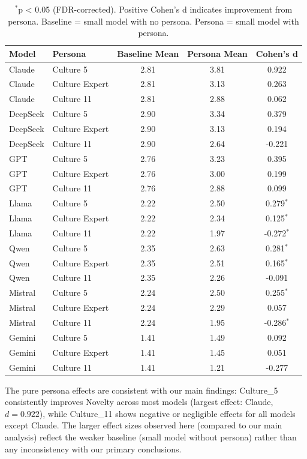 \documentclass{article}
\begin{document}
\begin{table}[H]
\centering
\caption{Pure Persona Effects (Small Baseline vs. Small+Persona) for Novelty}
\label{tab:pure_persona}
\begin{tabular}{llccc}
\toprule
Model & Persona & Baseline Mean & Persona Mean & Cohen's d \\
\midrule
Claude & Culture 5 & 2.81 & 3.81 & 0.922 \\
Claude & Culture Expert & 2.81 & 3.13 & 0.263 \\
Claude & Culture 11 & 2.81 & 2.88 & 0.062 \\
DeepSeek & Culture 5 & 2.90 & 3.34 & 0.379 \\
DeepSeek & Culture Expert & 2.90 & 3.13 & 0.194 \\
DeepSeek & Culture 11 & 2.90 & 2.64 & -0.221 \\
GPT & Culture 5 & 2.76 & 3.23 & 0.395 \\
GPT & Culture Expert & 2.76 & 3.00 & 0.199 \\
GPT & Culture 11 & 2.76 & 2.88 & 0.099 \\
Llama & Culture 5 & 2.22 & 2.50 & 0.279$^*$ \\
Llama & Culture Expert & 2.22 & 2.34 & 0.125$^*$ \\
Llama & Culture 11 & 2.22 & 1.97 & -0.272$^*$ \\
Qwen & Culture 5 & 2.35 & 2.63 & 0.281$^*$ \\
Qwen & Culture Expert & 2.35 & 2.51 & 0.165$^*$ \\
Qwen & Culture 11 & 2.35 & 2.26 & -0.091 \\
Mistral & Culture 5 & 2.24 & 2.50 & 0.255$^*$ \\
Mistral & Culture Expert & 2.24 & 2.29 & 0.057 \\
Mistral & Culture 11 & 2.24 & 1.95 & -0.286$^*$ \\
Gemini & Culture 5 & 1.41 & 1.49 & 0.092 \\
Gemini & Culture Expert & 1.41 & 1.45 & 0.051 \\
Gemini & Culture 11 & 1.41 & 1.21 & -0.277 \\
\bottomrule
\end{tabular}
\caption*{\footnotesize $^*$p < 0.05 (FDR-corrected). Positive Cohen's d indicates improvement from persona. Baseline = small model with no persona. Persona = small model with persona.}
\end{table}

The pure persona effects are consistent with our main findings: 
Culture\_5 consistently improves Novelty across most models (largest effect: 
Claude, \(d = 0.922\)), while Culture\_11 shows negative or negligible effects 
for all models except Claude. The larger effect sizes observed here (compared to 
our main analysis) reflect the weaker baseline (small model without persona) 
rather than any inconsistency with our primary conclusions.


\printbibliography
\end{document}
